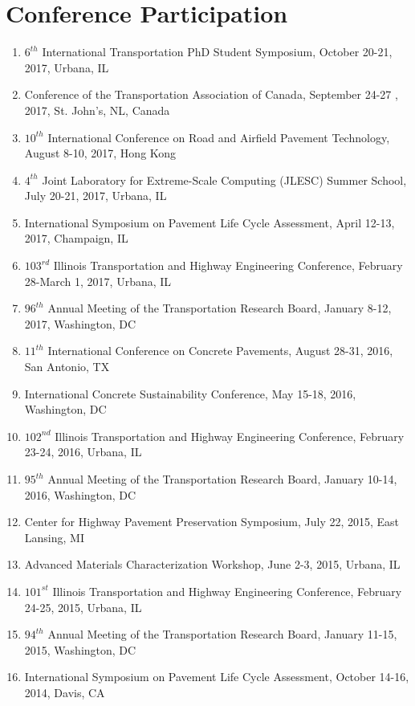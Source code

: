 \documentclass[12pt]{article}
\begin{document}
\section*{Conference Participation}
\begin{enumerate}[label=(\arabic*)]
	\item $6^{th}$ International Transportation PhD Student Symposium, October 20-21, 2017, Urbana, IL
	\item Conference of the Transportation Association of Canada, September 24-27 , 2017, St. John’s, NL, Canada
	\item $10^{th}$ International Conference on Road and Airfield Pavement Technology, August 8-10, 2017, Hong Kong
	\item $4^{th}$ Joint Laboratory for Extreme-Scale Computing (JLESC) Summer School, July 20-21, 2017, Urbana, IL
	\item International Symposium on Pavement Life Cycle Assessment, April 12-13, 2017, Champaign, IL
	\item $103^{rd}$ Illinois Transportation and Highway Engineering Conference, February 28-March 1, 2017, Urbana, IL
	\item $96^{th}$ Annual Meeting of the Transportation Research Board, January 8-12, 2017, Washington, DC
	\item $11^{th}$ International Conference on Concrete Pavements, August 28-31, 2016, San Antonio, TX
	\item International Concrete Sustainability Conference, May 15-18, 2016, Washington, DC
	\item $102^{nd}$ Illinois Transportation and Highway Engineering Conference, February 23-24, 2016, Urbana, IL
	\item $95^{th}$ Annual Meeting of the Transportation Research Board, January 10-14, 2016, Washington, DC
	\item Center for Highway Pavement Preservation Symposium, July 22, 2015, East Lansing, MI
	\item Advanced Materials Characterization Workshop, June 2-3, 2015, Urbana, IL
	\item $101^{st}$ Illinois Transportation and Highway Engineering Conference, February 24-25, 2015, Urbana, IL
	\item $94^{th}$ Annual Meeting of the Transportation Research Board, January 11-15, 2015, Washington, DC
	\item International Symposium on Pavement Life Cycle Assessment, October 14-16, 2014, Davis, CA
\end{enumerate}
\end{document}
